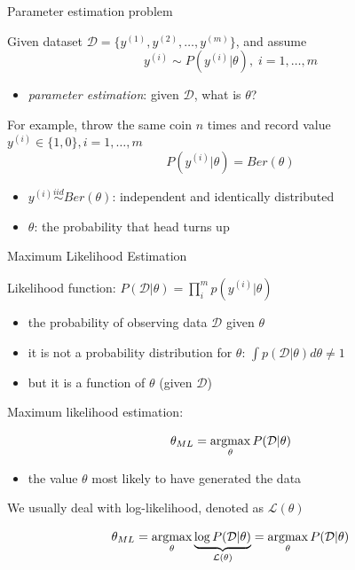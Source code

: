 \documentclass[ignorenonframetext,]{beamer}
\providecommand{\tightlist}{%
  \setlength{\itemsep}{0pt}\setlength{\parskip}{0pt}}
\newcommand{\argmax}{\operatornamewithlimits{argmax}}
\newcommand{\di}[2]{\ensuremath{ #1^{(#2)}}}
\begin{document}
\begin{frame}{Parameter estimation problem}
\protect\hypertarget{parameter-estimation-problem}{}

Given dataset
\(\mathcal{D} =\{\di{y}{1}, \di{y}{2},\ldots,\di{y}{m}\}\), and assume
\[\di{y}{i} {\sim}  P(\di{y}{i}| \theta), \;  i=1,\ldots, m\]

\begin{itemize}
\tightlist
\item
  \emph{parameter estimation}: given \(\mathcal{D}\), what is
  \(\theta\)?
\end{itemize}

\bigskip

For example, throw the same coin \(n\) times and record value
\(\di{y}{i}\in \{1,0\}, i=1,\ldots,m\)
\[P(\di{y}{i}|\theta) = Ber(\theta)\]

\begin{itemize}
\tightlist
\item
  \(\di{y}{i} \stackrel{iid}{\sim} Ber(\theta)\): independent and
  identically distributed
\item
  \(\theta\): the probability that head turns up
\end{itemize}

\end{frame}

\begin{frame}{Maximum Likelihood Estimation}
\protect\hypertarget{maximum-likelihood-estimation}{}

Likelihood function:
\(P(\mathcal{D}|\theta)= \prod_i^m p(\di{y}{i}|\theta)\)

\begin{itemize}
\tightlist
\item
  the probability of observing data \(\mathcal{D}\) given \(\theta\)
\item
  it is not a probability distribution for \(\theta\):
  \(\int p(\mathcal{D}|\theta) d\theta \neq 1\)
\item
  but it is a function of \(\theta\) (given \(\mathcal{D}\))
\end{itemize}

\bigskip

Maximum likelihood estimation:

\[\theta_{ML} = \argmax_{\theta} P(\mathcal{D}|\theta)\]

\begin{itemize}
\tightlist
\item
  the value \(\theta\) most likely to have generated the data
\end{itemize}

\bigskip

We usually deal with log-likelihood, denoted as \(\mathcal{L}(\theta)\)

\[\theta_{ML} = \argmax_{\theta} \underbrace{\log P(\mathcal{D}|\theta)}_{\mathcal{L}(\theta)}= \argmax_{\theta} P(\mathcal{D}|\theta)\]

\end{frame}
\end{document}
